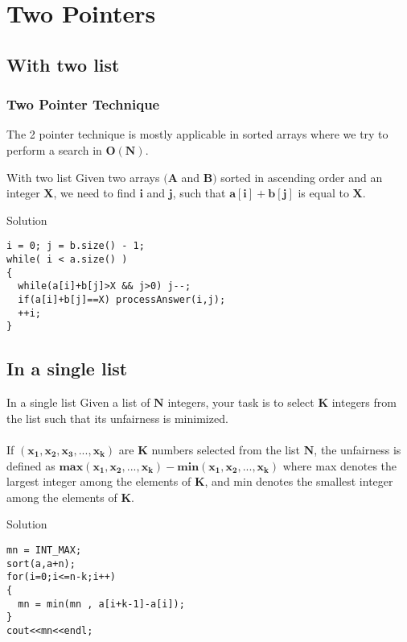 \documentclass{beamer}
\begin{document}
\section{Two Pointers}
\subsection{With two list }
\begin{frame}[fragile]
\frametitle{Two Pointer Technique}

 The 2 pointer technique is mostly applicable in sorted arrays where we try to perform a search in $\mathbf{O(N)}$.

 \begin{block}{With two list }
Given two arrays $\mathbf{(A}$ and $\mathbf{B)}$ sorted in ascending order and an integer $\mathbf{X}$, we need to find $\mathbf{i}$ and $\mathbf{j}$, such that $\mathbf{a[i] + b[j]}$ is equal to $\mathbf{X}$.
\end{block}

\begin{block}{Solution}
\begin{lstlisting}
i = 0; j = b.size() - 1;
while( i < a.size() )
{
  while(a[i]+b[j]>X && j>0) j--;
  if(a[i]+b[j]==X) processAnswer(i,j);
  ++i;
}
\end{lstlisting}
\end{block}

\end{frame}

\subsection{In a single list}
\begin{frame}[fragile]
 \begin{block}{In a single list}
Given a list of $\mathbf{N}$ integers, your task is to select $\mathbf{K}$ integers from the list such that its unfairness is minimized. 
\\~\\
If $(\mathbf{x_1,x_2,x_3,...,x_k})$ are $\mathbf{K}$ numbers selected from the list $\mathbf{N}$, the unfairness is defined as $ \mathbf{max(x_1,x_2,...,x_k) - min(x_1,x_2,...,x_k)}$ where max denotes the largest integer among the elements of $\mathbf{K}$, and min denotes the smallest integer among the elements of $\mathbf{K}$.
\end{block}

\begin{block}{Solution}
\begin{lstlisting}
mn = INT_MAX;
sort(a,a+n);
for(i=0;i<=n-k;i++)
{
  mn = min(mn , a[i+k-1]-a[i]);
}
cout<<mn<<endl;
\end{lstlisting}
\end{block}
\end{frame}
\end{document}
